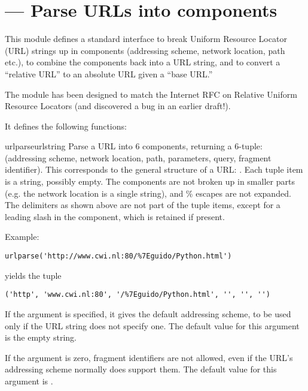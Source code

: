 \section{ ---
         Parse URLs into components}




This module defines a standard interface to break Uniform Resource
Locator (URL) strings up in components (addressing scheme, network
location, path etc.), to combine the components back into a URL
string, and to convert a ``relative URL'' to an absolute URL given a
``base URL.''

The module has been designed to match the Internet RFC on Relative
Uniform Resource Locators (and discovered a bug in an earlier
draft!).

It defines the following functions:

\begin{funcdesc}{urlparse}{urlstring}
Parse a URL into 6 components, returning a 6-tuple: (addressing
scheme, network location, path, parameters, query, fragment
identifier).  This corresponds to the general structure of a URL:
.
Each tuple item is a string, possibly empty.
The components are not broken up in smaller parts (e.g. the network
location is a single string), and \% escapes are not expanded.
The delimiters as shown above are not part of the tuple items,
except for a leading slash in the  component, which is
retained if present.

Example:

\begin{verbatim}
urlparse('http://www.cwi.nl:80/%7Eguido/Python.html')
\end{verbatim}

yields the tuple

\begin{verbatim}
('http', 'www.cwi.nl:80', '/%7Eguido/Python.html', '', '', '')
\end{verbatim}

If the  argument is specified, it gives the
default addressing scheme, to be used only if the URL string does not
specify one.  The default value for this argument is the empty string.

If the  argument is zero, fragment identifiers
are not allowed, even if the URL's addressing scheme normally does
support them.  The default value for this argument is .
\end{funcdesc}

